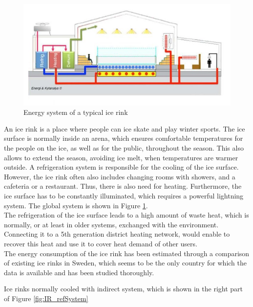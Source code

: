 \documentclass{article}
\begin{document}
\begin{figure}[h!]
\centering
\includegraphics[width=1\textwidth]{IR_schema.JPG}
\caption{Energy system of a typical ice rink \cite{gronqvistComparativeLifecycleCost}}
\label{fig:IR_schema}
\end{figure}

An ice rink is a place where people can ice skate and play winter sports. The ice surface is normally inside an arena, which ensures comfortable temperatures for the people on the ice, as well as for the public, throughout the season. This also allows to extend the season, avoiding ice melt, when temperatures are warmer outside. A refrigeration system is responsible for the cooling of the ice surface. However, the ice rink often also includes changing rooms with showers, and a cafeteria or a restaurant. Thus, there is also need for heating. Furthermore, the ice surface has to be constantly illuminated, which requires a powerful lightning system. The global system is shown in Figure \ref{fig:IR_schema}.\\

The refrigeration of the ice surface leads to a high amount of waste heat, which is normally, or at least in older systems, exchanged with the environment. Connecting it to a 5th generation district heating network, would enable to recover this heat and use it to cover heat demand of other users.\\

The energy consumption of the ice rink has been estimated through a comparison of existing ice rinks in Sweden, which seems to be the only country for which the data is available and has been studied thoroughly.


Ice rinks normally cooled with indirect system, which is shown in the right part of Figure \ref{fig:IR_refSystem}
\end{document}
